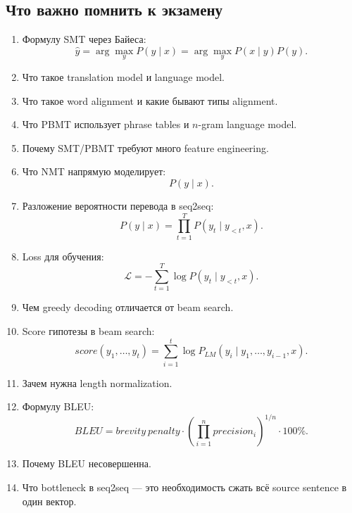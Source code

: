 \documentclass[a4paper,12pt]{article}
\begin{document}
\subsection{Что важно помнить к экзамену}

\begin{enumerate}
    \item Формулу SMT через Байеса:
    \[
    \hat{y}
    =
    \arg\max_y P(y \mid x)
    =
    \arg\max_y P(x \mid y)P(y).
    \]

    \item Что такое translation model и language model.

    \item Что такое word alignment и какие бывают типы alignment.

    \item Что PBMT использует phrase tables и \(n\)-gram language model.

    \item Почему SMT/PBMT требуют много feature engineering.

    \item Что NMT напрямую моделирует:
    \[
    P(y \mid x).
    \]

    \item Разложение вероятности перевода в seq2seq:
    \[
    P(y \mid x)
    =
    \prod_{t=1}^{T}
    P(y_t \mid y_{<t}, x).
    \]

    \item Loss для обучения:
    \[
    \mathcal{L}
    =
    -
    \sum_{t=1}^{T}
    \log P(y_t \mid y_{<t}, x).
    \]

    \item Чем greedy decoding отличается от beam search.

    \item Score гипотезы в beam search:
    \[
    score(y_1,\dots,y_t)
    =
    \sum_{i=1}^{t}
    \log P_{LM}(y_i \mid y_1,\dots,y_{i-1}, x).
    \]

    \item Зачем нужна length normalization.

    \item Формулу BLEU:
    \[
    BLEU
    =
    brevity\ penalty
    \cdot
    \left(
    \prod_{i=1}^{n}
    precision_i
    \right)^{1/n}
    \cdot
    100\%.
    \]

    \item Почему BLEU несовершенна.

    \item Что bottleneck в seq2seq --- это необходимость сжать всё source sentence в один вектор.


\end{enumerate}
\end{document}

